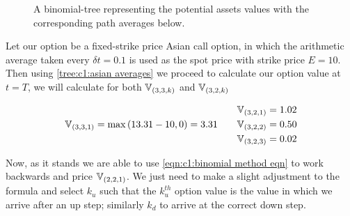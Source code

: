 \begin{figure}[H]
    \caption{A binomial-tree representing the potential assets values with the corresponding path averages below.}\label{tree:c1:asian averages}
\end{figure}

Let our option be a fixed-strike price Asian call option, in which the arithmetic average taken every \(\delta t = 0.1\) is used as the spot price with strike price \(E = 10\). Then using \autoref{tree:c1:asian averages} we proceed to calculate our option value at \(t = T\), we will calculate for both \(\mathbb{V}_{\left(3,3,k\right)}\) and \(\mathbb{V}_{\left(3,2,k\right)}\)

\begin{align*}
    \begin{split}
        \mathbb{V}_{\left(3,3,1\right)} &= \max\left(13.31-10,0\right) = 3.31
    \end{split}
    &&
    \begin{split}
        \mathbb{V}_{\left(3,2,1\right)} &= 1.02 \\
        \mathbb{V}_{\left(3,2,2\right)} &= 0.50 \\
        \mathbb{V}_{\left(3,2,3\right)} &= 0.02 \\
    \end{split}
\end{align*}

Now, as it stands we are able to use \autoref{eqn:c1:binomial method eqn} to work backwards and price \(\mathbb{V}_{\left(2,2,1\right)}\). We just need to make a slight adjustment to the formula and select \(k_u\) such that the \(k_u^{th}\) option value is the value in which we arrive after an up step; similarly \(k_d\) to arrive at the correct down step.

